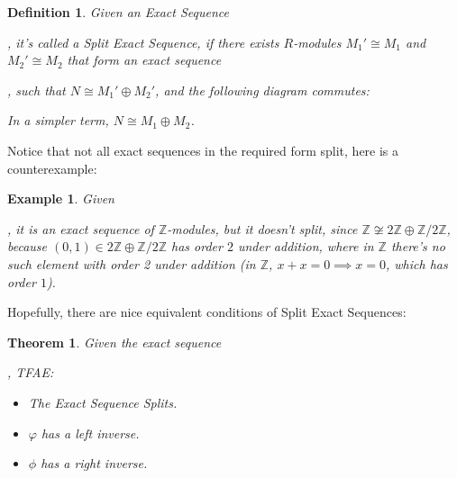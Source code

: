 \documentclass[x11names,reqno,12pt]{extarticle}
\newtheorem{defn}{Definition}
\newtheorem{thm}{Theorem}
\newtheorem{exm}{Example}
\begin{document}
\begin{defn}
    Given an Exact Sequence , it's called a \emph{Split Exact Sequence}, if there exists $R$-modules $M_1'\cong M_1$ and $M_2'\cong M_2$ that form an exact sequence , such that $N\cong M_1'\oplus M_2'$, and the following diagram commutes:
    \begin{center}
    \end{center}
    In a simpler term, $N\cong M_1\oplus M_2$.
\end{defn}
Notice that not all exact sequences in the required form split, here is a counterexample:
\begin{exm}
    Given , it is an exact sequence of $\mathbb{Z}$-modules, but it doesn't split, since $\mathbb{Z}\not\cong 2\mathbb{Z}\oplus \mathbb{Z}/2\mathbb{Z}$, because $(0,1)\in 2\mathbb{Z}\oplus \mathbb{Z}/2\mathbb{Z}$ has order $2$ under addition, where in $\mathbb{Z}$ there's no such element with order 2 under addition (in $\mathbb{Z}$, $x+x=0\implies x=0$, which has order $1$).
\end{exm}
Hopefully, there are nice equivalent conditions of Split Exact Sequences:
\begin{thm}
    Given the exact sequence , TFAE:
    \begin{itemize}
        \item[(1)] The Exact Sequence Splits.
        \item[(2)] $\varphi$ has a left inverse.
        \item[(3)] $\phi$ has a right inverse.
    \end{itemize}
\end{thm}
\end{document}
